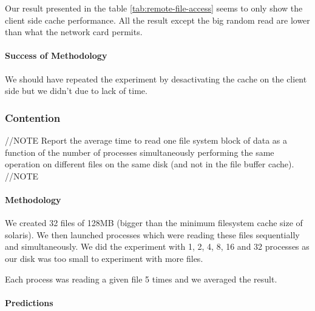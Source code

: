 Our result presented in the table \ref{tab:remote-file-access} seems to only
show the client side cache performance.
All the result except the big random read are lower than what the network card
permits.

\paragraph{Success of Methodology}
We should have repeated the experiment by desactivating the cache on the client
side but we didn't due to lack of time.


\subsubsection{Contention}
//NOTE
Report the average time to read one file system block of data as a function of the number of processes simultaneously performing the same operation on different files on the same disk (and not in the file buffer cache).
//NOTE

\paragraph{Methodology}
We created 32 files of 128MB (bigger than the minimum filesystem cache size of
solaris).
We then launched processes which were reading these files sequentially and
simultaneously.
We did the experiment with 1, 2, 4, 8, 16 and 32 processes as our disk was too
small to experiment with more files.

Each process was reading a given file 5 times and we averaged the result.

\paragraph{Predictions}


